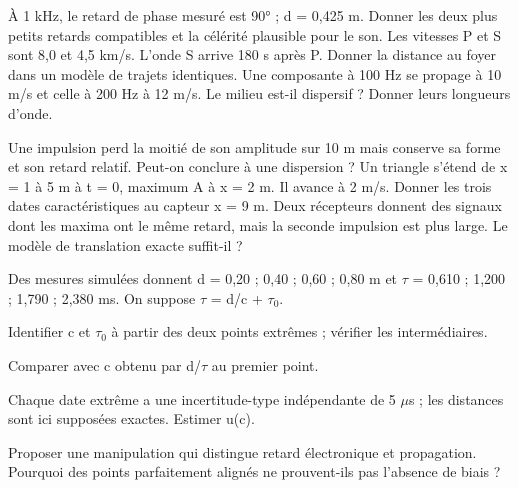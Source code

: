 À 1 kHz, le retard de phase mesuré est 90° ; d = 0,425 m. Donner les deux plus petits retards compatibles et la célérité plausible pour le son.
Les vitesses P et S sont 8,0 et 4,5 km/s. L’onde S arrive 180 s après P. Donner la distance au foyer dans un modèle de trajets identiques.
Une composante à 100 Hz se propage à 10 m/s et celle à 200 Hz à 12 m/s. Le milieu est-il dispersif ? Donner leurs longueurs d’onde.


Une impulsion perd la moitié de son amplitude sur 10 m mais conserve sa forme et son retard relatif. Peut-on conclure à une dispersion ?
Un triangle s’étend de x = 1 à 5 m à t = 0, maximum A à x = 2 m. Il avance à 2 m/s. Donner les trois dates caractéristiques au capteur x = 9 m.
Deux récepteurs donnent des signaux dont les maxima ont le même retard, mais la seconde impulsion est plus large. Le modèle de translation exacte suffit-il ?


\label{ex-D1}
Des mesures simulées donnent d = 0,20 ; 0,40 ; 0,60 ; 0,80 m et \ensuremath{\tau} = 0,610 ; 1,200 ; 1,790 ; 2,380 ms. On suppose \ensuremath{\tau} = d/c + \ensuremath{\tau_0}.\begin{questions}
\item Identifier c et \ensuremath{\tau_0} à partir des deux points extrêmes ; vérifier les intermédiaires.
\item Comparer avec c obtenu par d/\ensuremath{\tau} au premier point.
\item Chaque date extrême a une incertitude-type indépendante de 5 \ensuremath{\mu}s ; les distances sont ici supposées exactes. Estimer u(c).
\item Proposer une manipulation qui distingue retard électronique et propagation. Pourquoi des points parfaitement alignés ne prouvent-ils pas l’absence de biais ?
\end{questions}


